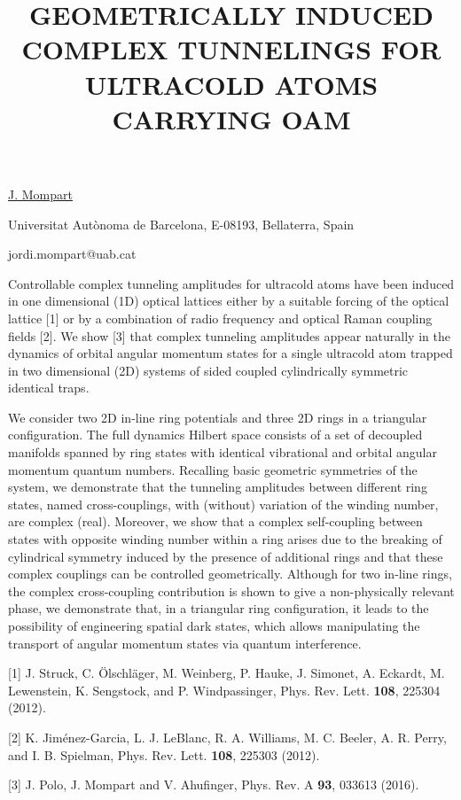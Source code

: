 \title{GEOMETRICALLY INDUCED COMPLEX TUNNELINGS FOR ULTRACOLD ATOMS CARRYING OAM}

\underline{J. Mompart} 

{\normalsize{\vspace{-4mm}
Universitat Aut\`{o}noma de Barcelona, E-08193, Bellaterra, Spain

\email jordi.mompart@uab.cat}}

Controllable complex tunneling amplitudes for ultracold atoms have been induced in one
dimensional (1D) optical lattices either by a suitable forcing of the optical lattice [1] or by
a combination of radio frequency and optical Raman coupling fields [2]. We show [3] that
complex tunneling amplitudes appear naturally in the dynamics of orbital angular momentum
states for a single ultracold atom trapped in two dimensional (2D) systems of sided coupled
cylindrically symmetric identical traps.

We consider two 2D in-line ring potentials and three 2D rings in a triangular configuration.
The full dynamics Hilbert space consists of a set of decoupled manifolds spanned by ring states
with identical vibrational and orbital angular momentum quantum numbers. Recalling basic
geometric symmetries of the system, we demonstrate that the tunneling amplitudes between
different ring states, named cross-couplings, with (without) variation of the winding number,
are complex (real). Moreover, we show that a complex self-coupling between states with opposite
winding number within a ring arises due to the breaking of cylindrical symmetry induced by the
presence of additional rings and that these complex couplings can be controlled geometrically.
Although for two in-line rings, the complex cross-coupling contribution is shown to give a non-physically
relevant phase, we demonstrate that, in a triangular ring configuration, it leads to
the possibility of engineering spatial dark states, which allows manipulating the transport of
angular momentum states via quantum interference.

{\normalsize
[1] J. Struck, C. \"{O}lschläger, M. Weinberg, P. Hauke, J. Simonet, A. Eckardt, M. Lewenstein, K.
Sengstock, and P. Windpassinger, Phys. Rev. Lett. \textbf{108}, 225304 (2012).
\vsp

[2] K. Jim\'{e}nez-Garcia, L. J. LeBlanc, R. A. Williams, M. C. Beeler, A. R. Perry, and I. B.
Spielman, Phys. Rev. Lett. \textbf{108}, 225303 (2012).
\vsp

[3] J. Polo, J. Mompart and V. Ahufinger, Phys. Rev. A \textbf{93}, 033613 (2016).
}



\vspace{\baselineskip} 